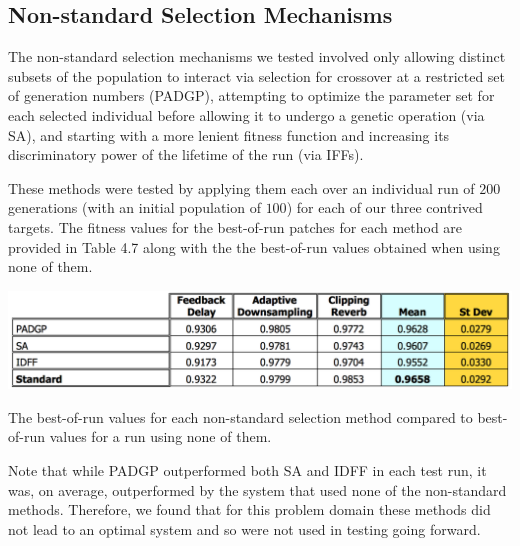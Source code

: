 \documentclass[a4paper,12pt]{report} 	%
\numberwithin{figure}{chapter}
\numberwithin{table}{chapter}
\numberwithin{equation}{chapter}
\begin{document}
\begin{flushleft}
\subsection{Non-standard Selection Mechanisms}
The non-standard selection mechanisms we tested involved only allowing distinct subsets of the population to interact via selection for crossover at a restricted set of generation numbers (PADGP), attempting to optimize the parameter set for each selected individual before allowing it to undergo a genetic operation (via SA), and starting with a more lenient fitness function and increasing its discriminatory power of the lifetime of the run (via IFFs).

These methods were tested by applying them each over an individual run of $200$ generations (with an initial population of $100$) for each of our three contrived targets. The fitness values for the best-of-run patches for each method are provided in Table 4.7 along with the the best-of-run values obtained when using none of them.
\begin{table}[h!]
\begin{center}
\includegraphics[scale=0.6,width=\linewidth]{NonStandardSelectionTable}
\caption[Non-standard Selection Best-of-Run Values]{The best-of-run values for each non-standard selection method compared to best-of-run values for a run using none of them.}
\end{center}
\end{table}
Note that while PADGP outperformed both SA and IDFF in each test run, it was, on average, outperformed by the system that used none of the non-standard methods. Therefore, we found that for this problem domain these methods did not lead to an optimal system and so were not used in testing going forward.


\end{flushleft}
\end{document}
